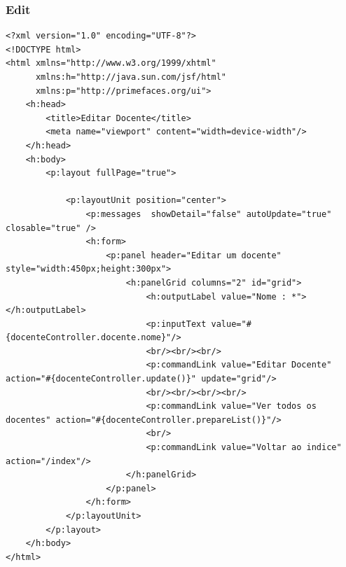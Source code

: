 \documentclass[12pt,a4paper]{article}
\begin{document}
\subsubsection{Edit}
\label{subsubsectionDocenteEdit}
\begin{lstlisting}
<?xml version="1.0" encoding="UTF-8"?>
<!DOCTYPE html>
<html xmlns="http://www.w3.org/1999/xhtml"
      xmlns:h="http://java.sun.com/jsf/html"
      xmlns:p="http://primefaces.org/ui">
    <h:head>
        <title>Editar Docente</title>
        <meta name="viewport" content="width=device-width"/>
    </h:head>
    <h:body>
        <p:layout fullPage="true">

            <p:layoutUnit position="center">
                <p:messages  showDetail="false" autoUpdate="true" closable="true" />
                <h:form>
                    <p:panel header="Editar um docente" style="width:450px;height:300px">  
                        <h:panelGrid columns="2" id="grid"> 
                            <h:outputLabel value="Nome : *"></h:outputLabel>  
                            <p:inputText value="#{docenteController.docente.nome}"/>    
                            <br/><br/><br/>
                            <p:commandLink value="Editar Docente" action="#{docenteController.update()}" update="grid"/> 
                            <br/><br/><br/><br/>
                            <p:commandLink value="Ver todos os docentes" action="#{docenteController.prepareList()}"/>
                            <br/>
                            <p:commandLink value="Voltar ao indice" action="/index"/>
                        </h:panelGrid>  
                    </p:panel>
                </h:form>
            </p:layoutUnit>
        </p:layout>
    </h:body>
</html>
\end{lstlisting}
\end{document}
